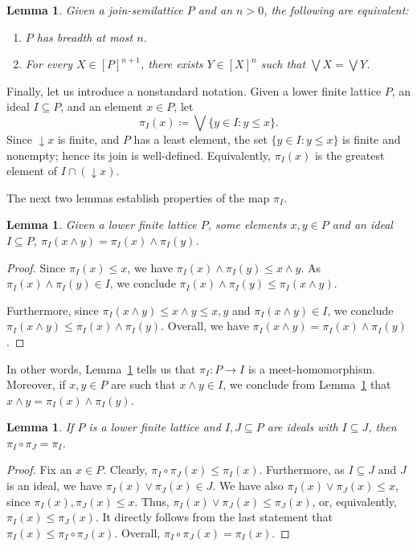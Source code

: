 \documentclass[]{amsart}
\newtheorem{lemma}[theorem]{Lemma}
\theoremstyle{definition}
\theoremstyle{remark}
\begin{document}
\begin{lemma}
Given a join-semilattice $P$ and an $n > 0$, the following are equivalent:
\begin{enumerate}[label={\upshape (\arabic*)}]
\itemsep0.3em
\item $P$ has breadth at most $n$.
\item For every $X \in [P]^{n+1}$, there exists $Y \in [X]^n$ such that $\bigvee X = \bigvee Y$.
\end{enumerate}
\end{lemma}


Finally, let us introduce a nonstandard notation. Given a lower finite lattice $P$, an ideal $I\subseteq P$, and an element $x \in P$, let
\[
\pi_I(x) \coloneqq \bigvee \{y \in I : y \le x\}.
\]
Since ${\downarrow} x$ is finite, and $P$ has a least element, the set $\{y \in I : y \le x\}$ is finite and nonempty; hence its join is well-defined. Equivalently, $\pi_I(x)$ is the greatest element of $I \cap ({\downarrow} x)$.


The next two lemmas establish properties of the map $\pi_I$.

\begin{lemma}\label{lemma:meetproj}
Given a lower finite lattice $P$, some elements $x,y \in P$ and an ideal $I \subseteq P$, $\pi_I(x \wedge y) = \pi_I(x) \wedge \pi_I(y)$.
\end{lemma}
\begin{proof}
Since $\pi_I(x) \le x$, we have $\pi_I(x) \wedge \pi_I(y) \le x \wedge y$. As $\pi_I(x) \wedge \pi_I(y) \in I$, we conclude  $\pi_I(x) \wedge \pi_I(y) \le \pi_I(x \wedge y)$.

Furthermore, since $\pi_I(x \wedge y) \le x \wedge y \le x,y$ and $\pi_I(x \wedge y) \in I$,  we conclude $\pi_I(x \wedge y) \le \pi_I(x) \wedge \pi_I(y)$. Overall, we have $\pi_I(x \wedge y) = \pi_I(x) \wedge \pi_I(y)$.
\end{proof}

In other words, Lemma~\ref{lemma:meetproj} tells us that $\pi_I : P\rightarrow I$ is a meet-homomorphism. Moreover, if $x,y \in P$ are such that $x \wedge y \in I$, we conclude from Lemma~\ref{lemma:meetproj} that $x \wedge y = \pi_I(x) \wedge \pi_I(y)$.

\begin{lemma}\label{lemma:concproj}
If $P$ is a lower finite lattice and $I,J \subseteq P$ are ideals with $I \subseteq J$, then $\pi_I \circ \pi_J = \pi_I$.
\end{lemma}
\begin{proof}
Fix an $x \in P$. Clearly, $\pi_I \circ \pi_J(x) \le \pi_I(x)$. Furthermore, as $I \subseteq J$ and $J$ is an ideal, we have $\pi_I (x) \vee \pi_J(x) \in J$. We have also $\pi_I(x) \vee \pi_J(x) \le x$, since $\pi_I(x), \pi_J(x) \le x$. Thus, $\pi_I (x) \vee \pi_J(x) \le \pi_J(x)$, or, equivalently, $\pi_I(x) \le \pi_J(x)$. It directly follows from the last statement that $\pi_I(x) \le \pi_I \circ \pi_J (x)$. Overall, $\pi_I \circ \pi_J (x) = \pi_I (x)$.
\end{proof}
\end{document}
